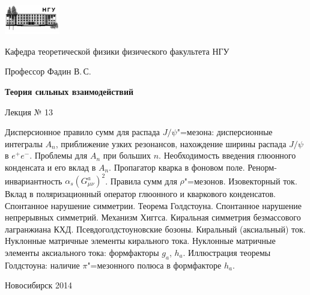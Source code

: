 \documentclass[12pt,pagesize,paper=192mm:108mm]{scrbook}
\begin{document}
\begin{titlepage}
  \vspace*{-1em}
  \begin{center}
    \includegraphics[width=0.18\textwidth]{../NSU-logo}

    Кафедра теоретической физики физического факультета НГУ

    \large
    Профессор Фадин В.\,С.
    \vspace{-0.5em}

    \huge
    \textbf{Теория сильных взаимодействий}
    
    \Large
    Лекция № 13
    \vfill
    
    \normalsize
    \begin{minipage}{0.95\linewidth}
      \small Дисперсионное правило сумм для распада $J/\psi$"=мезона:
      дисперсионные интегралы $A_n$, приближение узких резонансов,
      нахождение ширины распада $J/\psi$ в $e^+e^-$. Проблемы для
      $A_n$ при больших $n$. Необходимость введения глюонного
      конденсата и его вклад в $A_n$. Пропагатор кварка в фоновом
      поле. Ренорм-инвариантность
      $\alpha_s\left(G^a_{\mu\nu}\right)^2$. Правила сумм для
      $\rho$"=мезонов. Изовекторный ток. Вклад в поляризационный оператор
      глюонного и кваркового конденсатов. Спонтанное нарушение
      симметрии. Теорема Голдстоуна. Спонтанное нарушение непрерывных
      симметрий. Механизм Хиггса. Киральная симметрия безмассового
      лагранжиана КХД. Псевдоголдстоуновские бозоны. Киральный
      (аксиальный) ток. Нуклонные матричные элементы кирального
      тока. Нуклонные матричные элементы аксиального тока: формфакторы
      $g_a$, $h_a$. Иллюстрация теоремы Голдстоуна: наличие $\pi$"=мезонного
      полюса в формфакторе $h_a$.
    \end{minipage}
    \vfill
    
    \normalsize \ccbysa\hspace{0.5em} Новосибирск 2014   
  \end{center}
\end{titlepage}
\end{document}
